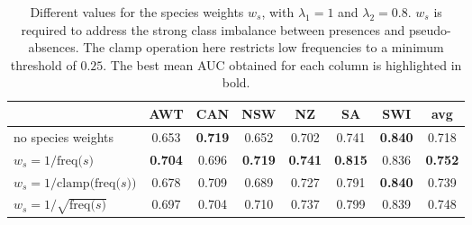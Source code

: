 \begin{table}[]
\centering
\caption{Different values for the species weights $w_s$, with $\lambda_1=1$ and $\lambda_2=0.8$. $w_s$ is required to address the strong class imbalance between presences and pseudo-absences. The clamp operation here restricts low frequencies to a minimum threshold of $0.25$. The best mean AUC obtained for each column is highlighted in bold.}

\setlength{\tabcolsep}{0.46\tabcolsep}  %
\renewcommand{\arraystretch}{1.2} %
\begin{tabular}{l|cccccc|c}
                                                & AWT   & CAN   & NSW   & NZ    & SA    & SWI   & avg   \\ 
    \hline \hline
    no species weights                          & 0.653 & \textbf{0.719} & 0.652 & 0.702 & 0.741 & \textbf{0.840} & 0.718 \\
    $w_s = 1/\text{freq(}s\text{)}$             & \textbf{0.704} & 0.696 & \textbf{0.719} & \textbf{0.741} & \textbf{0.815} & 0.836 & \textbf{0.752} \\
    $w_s = 1/\text{clamp(freq(}s\text{))}$       & 0.678 & 0.709 & 0.689 & 0.727 & 0.791 & \textbf{0.840} & 0.739 \\
    $w_s = 1/\sqrt{\text{freq(}s\text{)}}$      & 0.697 & 0.704 & 0.710 & 0.737 & 0.799 & 0.839 & 0.748 \\
    \hline
\end{tabular}

\label{tab:speciesweight}
\end{table}